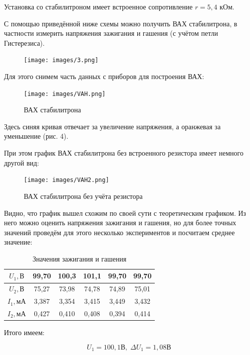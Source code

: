 \documentclass[a4paper, 12pt]{article}%
\begin{document}
Установка со стабилитроном имеет встроенное сопротивление $r = 5,4$ кОм.

С помощью приведённой ниже схемы можно получить ВАХ стабилитрона, в частности измерить напряжения зажигания и гашения (с учётом петли Гистерезиса).

\begin{figure}[h!]
    \centering
    \texttt{[image: images/3.png]}
    \caption{}
    \label{}
\end{figure}

Для этого снимем часть данных с приборов для построения ВАХ:

\begin{figure}[h!]
    \centering
    \texttt{[image: images/VAH.png]}
    \caption{ВАХ стабилитрона}
    \label{vah}
\end{figure}

Здесь синяя кривая отвечает за увеличение напряжения, а оранжевая за уменьшение (рис. 4).

При этом график ВАХ стабилитрона без встроенного резистора имеет немного другой вид:

\begin{figure}[h!]
    \centering
    \texttt{[image: images/VAH2.png]}
    \caption{ВАХ стабилитрона без учёта резистора}
    \label{vah2}
\end{figure}


Видно, что график вышел схожим по своей сути с теоретическим графиком.
Из него можно оценить напряжения зажигания и гашения, но для более точных значений проведём для этого несколько экспериментов и посчитаем среднее значение:

\begin{table}[h]
    \centering
    \begin{tabular}{|c|c|c|c|c|c|}
        \hline
        \textbf{$U_1, В$}  & 99,70 & 100,3  & 101,1  & 99,70 & 99,70 \\ \hline
        \textbf{$U_2, В$}  & 75,27 & 73,98  & 74,78  & 74,89 & 75,01 \\ \hline
        \textbf{$I_1, мА$} & 3,387 & 3,354  & 3,415  & 3,449 & 3,432 \\ \hline
        \textbf{$I_2, мА$} & 0,427 & 0,410  & 0,408  & 0,394 & 0,414 \\ \hline
    \end{tabular}
    \caption{Значения зажигания и гашения}
\end{table}

Итого имеем:

\begin{equation}
    U_1 = 100,1 \text{В}, \; \Delta  U_1 = 1,08 \text{В}
\end{equation}
\end{document}
